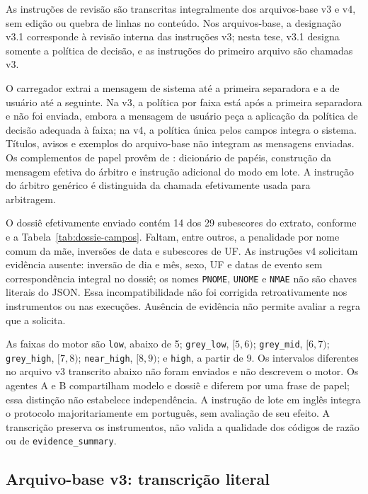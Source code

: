 As instruções de revisão são transcritas integralmente dos arquivos-base v3 e v4, sem edição ou quebra de linhas no conteúdo. Nos arquivos-base, a designação v3.1 corresponde à revisão interna das instruções v3; nesta tese, v3.1 designa somente a política de decisão, e as instruções do primeiro arquivo são chamadas v3.

O carregador extrai a mensagem de sistema até a primeira separadora e a de usuário até a seguinte. Na v3, a política por faixa está após a primeira separadora e não foi enviada, embora a mensagem de usuário peça a aplicação da política de decisão adequada à faixa; na v4, a política única pelos campos integra o sistema. Títulos, avisos e exemplos do arquivo-base não integram as mensagens enviadas. Os complementos de papel provêm de : dicionário de papéis, construção da mensagem efetiva do árbitro e instrução adicional do modo em lote. A instrução do árbitro genérico é distinguida da chamada efetivamente usada para arbitragem.

O dossiê efetivamente enviado contém 14 dos 29 subescores do extrato, conforme  e a Tabela~\ref{tab:dossie-campos}. Faltam, entre outros, a penalidade por nome comum da mãe, inversões de data e subescores de UF. As instruções v4 solicitam evidência ausente: inversão de dia e mês, sexo, UF e datas de evento sem correspondência integral no dossiê; os nomes \texttt{PNOME}, \texttt{UNOME} e \texttt{NMAE} não são chaves literais do JSON. Essa incompatibilidade não foi corrigida retroativamente nos instrumentos ou nas execuções. Ausência de evidência não permite avaliar a regra que a solicita.

As faixas do motor são \texttt{low}, abaixo de 5; \texttt{grey\_low}, $[5,6)$; \texttt{grey\_mid}, $[6,7)$; \texttt{grey\_high}, $[7,8)$; \texttt{near\_high}, $[8,9)$; e \texttt{high}, a partir de 9. Os intervalos diferentes no arquivo v3 transcrito abaixo não foram enviados e não descrevem o motor. Os agentes A e B compartilham modelo e dossiê e diferem por uma frase de papel; essa distinção não estabelece independência. A instrução de lote em inglês integra o protocolo majoritariamente em português, sem avaliação de seu efeito. A transcrição preserva os instrumentos, não valida a qualidade dos códigos de razão ou de \texttt{evidence\_summary}.

\subsection*{Arquivo-base v3: transcrição literal}

